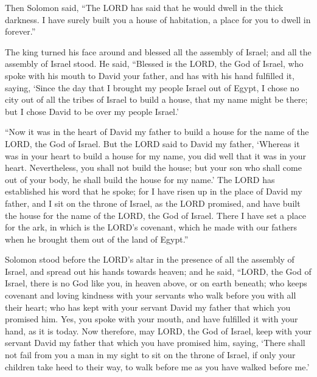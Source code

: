  Then Solomon said, ``The LORD has said that he would
dwell in the thick darkness.  I have surely built you a
house of habitation, a place for you to dwell in forever.''

 The king turned his face around and blessed all the
assembly of Israel; and all the assembly of Israel stood.
 He said, ``Blessed is the LORD, the God of Israel, who
spoke with his mouth to David your father, and has with his hand
fulfilled it, saying,  `Since the day that I brought my
people Israel out of Egypt, I chose no city out of all the tribes of
Israel to build a house, that my name might be there; but I chose David
to be over my people Israel.'

 ``Now it was in the heart of David my father to build a
house for the name of the LORD, the God of Israel.  But
the LORD said to David my father, `Whereas it was in your heart to build
a house for my name, you did well that it was in your heart.
 Nevertheless, you shall not build the house; but your
son who shall come out of your body, he shall build the house for my
name.'  The LORD has established his word that he spoke;
for I have risen up in the place of David my father, and I sit on the
throne of Israel, as the LORD promised, and have built the house for the
name of the LORD, the God of Israel.  There I have set a
place for the ark, in which is the LORD's covenant, which he made with
our fathers when he brought them out of the land of Egypt.''

 Solomon stood before the LORD's altar in the presence of
all the assembly of Israel, and spread out his hands towards heaven;
 and he said, ``LORD, the God of Israel, there is no God
like you, in heaven above, or on earth beneath; who keeps covenant and
loving kindness with your servants who walk before you with all their
heart;  who has kept with your servant David my father
that which you promised him. Yes, you spoke with your mouth, and have
fulfilled it with your hand, as it is today.  Now
therefore, may LORD, the God of Israel, keep with your servant David my
father that which you have promised him, saying, `There shall not fail
from you a man in my sight to sit on the throne of Israel, if only your
children take heed to their way, to walk before me as you have walked
before me.'

